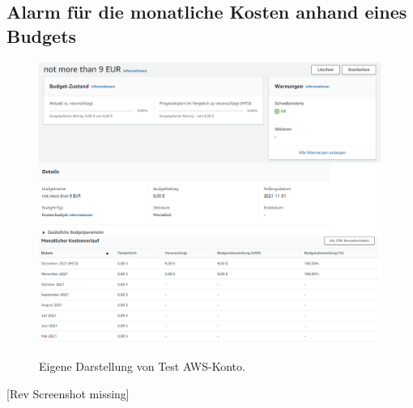 \subsection{Alarm für die monatliche Kosten anhand eines Budgets}\label{sec_Ang_B}
\begin{figure}[h!]
    \centering
    \includegraphics[scale=0.5]{sources/BudgetAlarm}
    \caption[Budgetalarm]{}
    \label{fig:CloudWatchDashboardTest} 
    Eigene Darstellung von Test AWS-Konto.
  \end{figure}
[Rev Screenshot missing]
